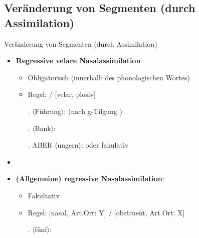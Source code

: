 %
\subsection{Veränderung von Segmenten (durch Assimilation)}
%

\begin{frame}{Veränderung von Segmenten (durch Assimilation)}

\begin{itemize}
	\item \textbf{Regressive velare Nasalassimilation}

	\begin{itemize}
		\item Obligatorisch (innerhalb des phonologischen Wortes)
		\item Regel:  \ras \textipa{[N]} /  \underline{\quad} [velar, plosiv]

		\ex. $\langle$Führung$\rangle$:  \ras \textipa{[fy:.\;RUNg]} (nach g-Tilgung \ras \textipa{[fy:.\;RUN]})
		
		\ex. $\langle$Bank$\rangle$:  \ras \textipa{[baNk]}
		
		\ex. ABER $\langle$ungern$\rangle$:  \ras \textipa{[PUn.gE\;Rn]} oder fakulativ \textipa{[PUN.gE\;Rn]}

	\end{itemize}
	
	\item[]
	\item \textbf{(Allgemeine) regressive Nasalassimilation}:

	\begin{itemize}
		\item Fakultativ
		\item Regel: [nasal, Art.Ort: Y]  /  \underline{\quad} [obstruent, Art.Ort: X]

		\ex. $\langle$fünf$\rangle$:  \ras \textipa{[fYmf]}

	\end{itemize}		

\end{itemize}

\end{frame}



